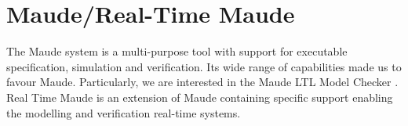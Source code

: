 \section{Maude/Real-Time Maude}

The Maude system \cite{MC03} is a multi-purpose tool with support for
executable specification, simulation and verification.
%
%
Its wide range of capabilities made us to favour Maude. Particularly,
we are interested in the Maude LTL Model Checker \cite{ES00}.  Real
Time Maude \cite{PO07b} is an extension of Maude containing specific
support enabling the modelling and verification
%
%
real-time systems.
%
%

